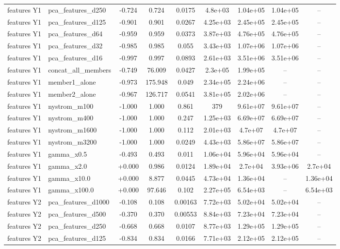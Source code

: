 \begin{tabular}{llccccccc}
features Y1 & pca\_features\_d250 & -0.724 & 0.724 & 0.0175 & 4.8e+03 & 1.04e+05 & 1.04e+05 & -- \\
features Y1 & pca\_features\_d125 & -0.901 & 0.901 & 0.0267 & 4.25e+03 & 2.45e+05 & 2.45e+05 & -- \\
features Y1 & pca\_features\_d64 & -0.959 & 0.959 & 0.0373 & 3.87e+03 & 4.76e+05 & 4.76e+05 & -- \\
features Y1 & pca\_features\_d32 & -0.985 & 0.985 & 0.055 & 3.43e+03 & 1.07e+06 & 1.07e+06 & -- \\
features Y1 & pca\_features\_d16 & -0.997 & 0.997 & 0.0893 & 2.61e+03 & 3.51e+06 & 3.51e+06 & -- \\
features Y1 & concat\_all\_members & -0.749 & 76.009 & 0.0427 & 2.3e+05 & 1.99e+05 & -- & -- \\
features Y1 & member1\_alone & -0.973 & 175.948 & 0.049 & 2.34e+05 & 2.24e+06 & -- & -- \\
features Y1 & member2\_alone & -0.967 & 126.717 & 0.0541 & 3.81e+05 & 2.02e+06 & -- & -- \\
features Y1 & nystrom\_m100 & -1.000 & 1.000 & 0.861 & 379 & 9.61e+07 & 9.61e+07 & -- \\
features Y1 & nystrom\_m400 & -1.000 & 1.000 & 0.247 & 1.25e+03 & 6.69e+07 & 6.69e+07 & -- \\
features Y1 & nystrom\_m1600 & -1.000 & 1.000 & 0.112 & 2.01e+03 & 4.7e+07 & 4.7e+07 & -- \\
features Y1 & nystrom\_m3200 & -1.000 & 1.000 & 0.0249 & 4.43e+03 & 5.86e+07 & 5.86e+07 & -- \\
features Y1 & gamma\_x0.5 & -0.493 & 0.493 & 0.011 & 1.06e+04 & 5.96e+04 & 5.96e+04 & -- \\
features Y1 & gamma\_x2.0 & +0.000 & 0.986 & 0.0124 & 1.89e+04 & 2.7e+04 & 3.93e+06 & 2.7e+04 \\
features Y1 & gamma\_x10.0 & +0.000 & 8.877 & 0.0445 & 4.73e+04 & 1.36e+04 & -- & 1.36e+04 \\
features Y1 & gamma\_x100.0 & +0.000 & 97.646 & 0.102 & 2.27e+05 & 6.54e+03 & -- & 6.54e+03 \\
features Y2 & pca\_features\_d1000 & -0.108 & 0.108 & 0.00163 & 7.72e+03 & 5.02e+04 & 5.02e+04 & -- \\
features Y2 & pca\_features\_d500 & -0.370 & 0.370 & 0.00553 & 8.84e+03 & 7.23e+04 & 7.23e+04 & -- \\
features Y2 & pca\_features\_d250 & -0.668 & 0.668 & 0.0107 & 8.77e+03 & 1.29e+05 & 1.29e+05 & -- \\
features Y2 & pca\_features\_d125 & -0.834 & 0.834 & 0.0166 & 7.71e+03 & 2.12e+05 & 2.12e+05 & -- \\

\end{tabular}
